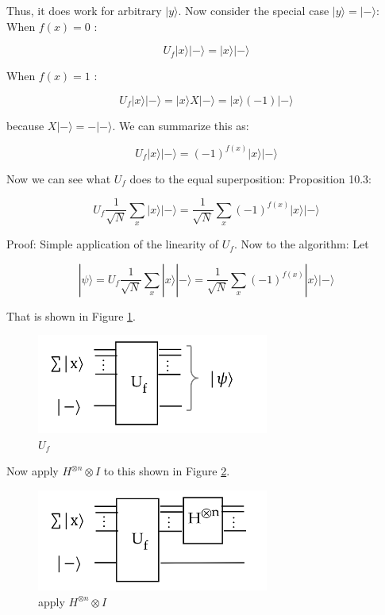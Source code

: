 \documentclass[main.tex]{subfiles}
\begin{document}
    Thus, it does work for arbitrary $|y\rangle$. Now consider the special case $|y\rangle=|-\rangle$: When $f(x)=0$ :
    
    $$
    U_{f}|x\rangle|-\rangle=|x\rangle|-\rangle
    $$
    
    When $f(x)=1$ :
    
    $$
    U_{f}|x\rangle|-\rangle=|x\rangle X|-\rangle=|x\rangle(-1)|-\rangle
    $$
    
    because $X|-\rangle=-|-\rangle$. We can summarize this as:
    
    $$
    U_{f}|x\rangle|-\rangle=(-1)^{f(x)}|x\rangle|-\rangle
    $$
    
    Now we can see what $U_{f}$ does to the equal superposition:
    Proposition 10.3:
    
    $$
    U_{f} \frac{1}{\sqrt{N}} \sum_{x}|x\rangle|-\rangle=\frac{1}{\sqrt{N}} \sum_{x}(-1)^{f(x)}|x\rangle|-\rangle
    $$
    
    Proof: Simple application of the linearity of $U_{f}$. Now to the algorithm: Let
    
    $$
    |\psi\rangle=U_{f} \frac{1}{\sqrt{N}} \sum_{x}|x\rangle|-\rangle=\frac{1}{\sqrt{N}} \sum_{x}(-1)^{f(x)}|x\rangle|-\rangle
    $$
    
    That is shown in Figure \ref{fig:16deutsch8}.
    
    \begin{figure}
        \centering
        \includegraphics[width=3in]{notes/figs/n11/16deutsch8.png}
            \caption{$U_{f}$}
        \label{fig:16deutsch8}
    \end{figure}
    
    Now apply $H^{\otimes n} \otimes I$ to this shown in Figure \ref{fig:17deutsch9}.
    
    \begin{figure}
        \centering
        \includegraphics[width=3in]{notes/figs/n11/17deutsch9.png}
            \caption{apply $H^{\otimes n} \otimes I$}
        \label{fig:17deutsch9}
    \end{figure}
    
\end{document}
